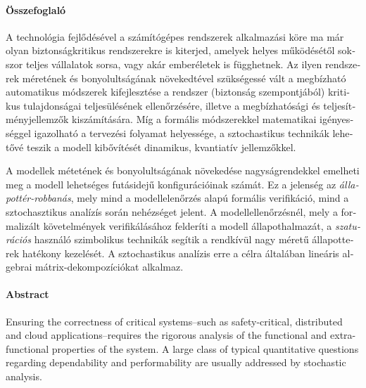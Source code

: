 \begin{otherlanguage}{magyar}

  \thispagestyle{plain}
  \paragraph*{Összefoglaló}

  A technológia fejlődésével a számítógépes rendszerek
  alkalmazási köre ma már olyan biztonságkritikus rendszerekre is
  kiterjed, amelyek helyes működésétől sokszor teljes vállalatok
  sorsa, vagy akár emberéletek is függhetnek. Az ilyen rendszerek
  méretének és bonyolultságának növekedtével szükségessé vált a
  megbízható automatikus módszerek kifejlesztése a rendszer (biztonság
  szempontjából) kritikus tulajdonságai teljesülésének ellenőrzésére,
  illetve a megbízhatósági és teljesítményjellemzők kiszámítására. Míg
  a formális módszerekkel matematikai igényességgel igazolható a
  tervezési folyamat helyessége, a sztochastikus technikák lehetővé
  teszik a modell kibővítését dinamikus, kvantiatív jellemzőkkel.

  A modellek métetének és bonyolultságának növekedése nagyságrendekkel
  emelheti meg a modell lehetséges futásidejű konfigurációinak
  számát. Ez a jelenség az \emph{állapottér-robbanás}, mely mind a
  modellelenőrzés alapú formális verifikáció, mind a sztochasztikus
  analízís során nehézséget jelent. A modellellenőrzésnél, mely a
  formalizált követelmények verifikálásához felderíti a modell
  állapothalmazát, a \emph{szaturációs} használó szimbolikus technikák
  segítik a rendkívül nagy méretű állapotterek hatékony kezelését. A
  sztochastikus analízis erre a célra általában lineáris algebrai
  mátrix-dekompozíciókat alkalmaz.

\end{otherlanguage}

\cleardoublepage

\thispagestyle{plain}
\paragraph*{Abstract}

Ensuring the correctness of critical systems--such as safety-critical,
distributed and cloud applications--requires the rigorous analysis of the
functional and extra-functional properties of the system. A large class of typical quantitative questions
regarding dependability and performability are usually addressed by stochastic
analysis. 

